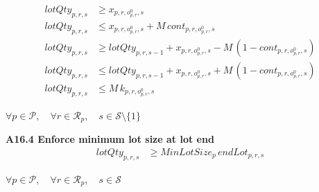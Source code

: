 \documentclass{article}
\begin{document}
\begin{align}
lotQty_{p,r,s}
&\ge
x_{p,r,o^0_{p,r},s}
\label{eq:A16_lotqty_ge_shiftprod}
\\
lotQty_{p,r,s}
&\le
x_{p,r,o^0_{p,r},s}
+
M \, cont_{p,r,o^0_{p,r},s}
\label{eq:A16_lotqty_le_shiftprod_if_no_cont}
\\
lotQty_{p,r,s}
&\ge
lotQty_{p,r,s-1}
+
x_{p,r,o^0_{p,r},s}
-
M \, (1-cont_{p,r,o^0_{p,r},s})
\label{eq:A16_lotqty_sum_prev_shift}
\\
lotQty_{p,r,s}
&\le
lotQty_{p,r,s-1}
+
x_{p,r,o^0_{p,r},s}
+
M \, (1-cont_{p,r,o^0_{p,r},s})
\label{eq:A16_lotqty_tight_prev_shift}
\\
lotQty_{p,r,s}
&\le
M \, k_{p,r,o^0_{p,r},s}
\label{eq:A16_lotqty_activate_lot}
\end{align}
\begin{center}
$\forall p \in \mathcal{P}, \quad
\forall r \in \mathcal{R}_p, \quad
s \in \mathcal{S}\setminus\{1\}$
\end{center}

\noindent\textbf{A16.4 Enforce minimum lot size at lot end}
\begin{align}
lotQty_{p,r,s}
&\ge
MinLotSize_p \, endLot_{p,r,s}
\label{eq:A16_min_lot_at_end}
\end{align}
\begin{center}
$\forall p \in \mathcal{P}, \quad
\forall r \in \mathcal{R}_p, \quad
s \in \mathcal{S}$
\end{center}
\end{document}
